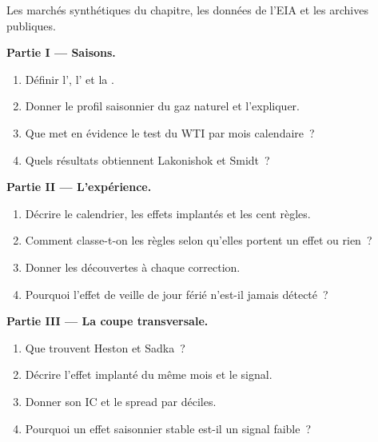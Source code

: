 \begin{problem}\label{pb:s1:seasonality-and-calendar-effects:1}
Les marchés synthétiques du chapitre, les données de l'EIA et les archives publiques.

\medskip\noindent\textbf{Partie I --- Saisons.}
\begin{enumerate}
\item Définir l', l' et la .
\item Donner le profil saisonnier du gaz naturel et l'expliquer.
\item Que met en évidence le test du WTI par mois calendaire~?
\item Quels résultats obtiennent Lakonishok et Smidt~?
\end{enumerate}

\medskip\noindent\textbf{Partie II --- L'expérience.}
\begin{enumerate}[resume]
\item Décrire le calendrier, les effets implantés et les cent règles.
\item Comment classe-t-on les règles selon qu'elles portent un effet ou rien~?
\item Donner les découvertes à chaque correction.
\item Pourquoi l'effet de veille de jour férié n'est-il jamais détecté~?
\end{enumerate}

\medskip\noindent\textbf{Partie III --- La coupe transversale.}
\begin{enumerate}[resume]
\item Que trouvent Heston et Sadka~?
\item Décrire l'effet implanté du même mois et le signal.
\item Donner son IC et le spread par déciles.
\item Pourquoi un effet saisonnier stable est-il un signal faible~?
\end{enumerate}


\end{problem}
